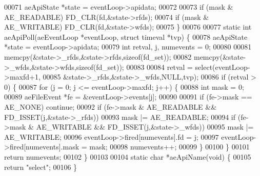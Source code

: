\begin{DoxyCode}
00071     aeApiState *state = eventLoop->apidata;
00072 
00073     \textcolor{keywordflow}{if} (mask & AE\_READABLE) FD\_CLR(fd,&state->rfds);
00074     \textcolor{keywordflow}{if} (mask & AE\_WRITABLE) FD\_CLR(fd,&state->wfds);
00075 \}
00076 
00077 \textcolor{keyword}{static} \textcolor{keywordtype}{int} aeApiPoll(aeEventLoop *eventLoop, \textcolor{keyword}{struct} timeval *tvp) \{
00078     aeApiState *state = eventLoop->apidata;
00079     \textcolor{keywordtype}{int} retval, j, numevents = 0;
00080 
00081     memcpy(&state->\_rfds,&state->rfds,\textcolor{keyword}{sizeof}(fd\_set));
00082     memcpy(&state->\_wfds,&state->wfds,\textcolor{keyword}{sizeof}(fd\_set));
00083 
00084     retval = select(eventLoop->maxfd+1,
00085                 &state->\_rfds,&state->\_wfds,NULL,tvp);
00086     \textcolor{keywordflow}{if} (retval > 0) \{
00087         \textcolor{keywordflow}{for} (j = 0; j <= eventLoop->maxfd; j++) \{
00088             \textcolor{keywordtype}{int} mask = 0;
00089             aeFileEvent *fe = &eventLoop->events[j];
00090 
00091             \textcolor{keywordflow}{if} (fe->mask == AE\_NONE) \textcolor{keywordflow}{continue};
00092             \textcolor{keywordflow}{if} (fe->mask & AE\_READABLE && FD\_ISSET(j,&state->\_rfds))
00093                 mask |= AE\_READABLE;
00094             \textcolor{keywordflow}{if} (fe->mask & AE\_WRITABLE && FD\_ISSET(j,&state->\_wfds))
00095                 mask |= AE\_WRITABLE;
00096             eventLoop->fired[numevents].fd = j;
00097             eventLoop->fired[numevents].mask = mask;
00098             numevents++;
00099         \}
00100     \}
00101     \textcolor{keywordflow}{return} numevents;
00102 \}
00103 
00104 \textcolor{keyword}{static} \textcolor{keywordtype}{char} *aeApiName(\textcolor{keywordtype}{void}) \{
00105     \textcolor{keywordflow}{return} \textcolor{stringliteral}{"select"};
00106 \}
\end{DoxyCode}
